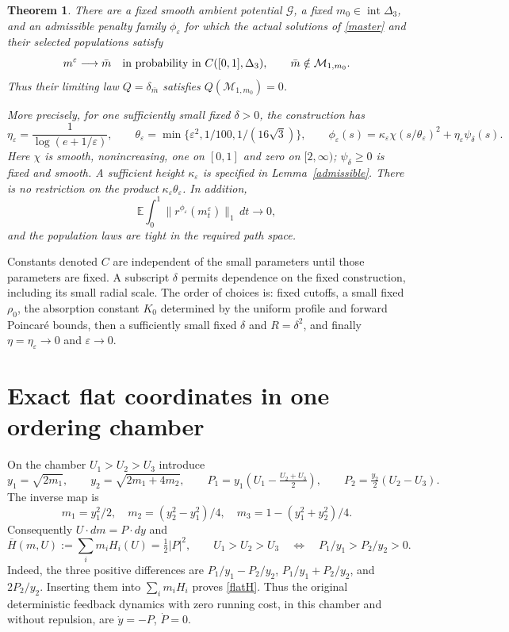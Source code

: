 \documentclass[11pt,a4paper]{article}
\newtheorem{theorem}{Theorem}
\newcommand{\E}{\mathbb E}
\newcommand{\G}{\mathcal G}
\newcommand{\Hb}{\overline H}
\newcommand{\dt}{\,dt}
\begin{document}
\begin{theorem}\label{main}
There are a fixed smooth ambient potential $\G$, a fixed
$m_0\in\operatorname{int}\Delta_3$, and an admissible penalty family
$\phi_\varepsilon$ for which the actual solutions of \eqref{master}
and their selected populations satisfy
\[
 m^\varepsilon\longrightarrow \bar m
 \quad\hbox{in probability in }C([0,1],\Delta_3),
 \qquad \bar m\notin\mathcal M_{1,m_0}.
\]
Thus their limiting law $Q=\delta_{\bar m}$ satisfies
$Q(\mathcal M_{1,m_0})=0$.

More precisely, for one sufficiently small fixed $\delta>0$, the
construction has
\begin{equation}\label{scales}
 \eta_\varepsilon=\frac1{\log(e+1/\varepsilon)},\qquad
 \theta_\varepsilon=\min\{\varepsilon^2,1/100,1/(16\sqrt3)\},
 \qquad
 \phi_\varepsilon(s)=\kappa_\varepsilon
       \chi(s/\theta_\varepsilon)^2+\eta_\varepsilon\psi_\delta(s).
\end{equation}
Here $\chi$ is smooth, nonincreasing, one on $[0,1]$ and zero on
$[2,\infty)$; $\psi_\delta\geq0$ is fixed and smooth. A sufficient
height $\kappa_\varepsilon$ is specified in Lemma~\ref{admissible}.
There is no restriction on the product
$\kappa_\varepsilon\theta_\varepsilon$. In addition,
\[
 \E\int_0^1\|r^{\phi_\varepsilon}(m_t^\varepsilon)\|_1\dt
       \longrightarrow0,
\]
and the population laws are tight in the required path space.
\end{theorem}

Constants denoted $C$ are independent of the small parameters until
those parameters are fixed. A subscript $\delta$ permits dependence
on the fixed construction, including its small radial scale.
The order of choices is: fixed cutoffs, a small fixed $\rho_0$, the
absorption constant $K_0$ determined by the uniform profile and forward
Poincar\'e bounds, then a sufficiently small fixed $\delta$ and
$R=\delta^2$, and finally
$\eta=\eta_\varepsilon\to0$ and $\varepsilon\to0$.

\section{Exact flat coordinates in one ordering chamber}
On the chamber $U_1>U_2>U_3$ introduce
\begin{equation}\label{flat}
 y_1=\sqrt{2m_1},\qquad y_2=\sqrt{2m_1+4m_2},\qquad
 P_1=y_1\left(U_1-\tfrac{U_2+U_3}{2}\right),\qquad
 P_2=\tfrac{y_2}{2}(U_2-U_3).
\end{equation}
The inverse map is
\[
 m_1=y_1^2/2,\quad m_2=(y_2^2-y_1^2)/4,\quad
 m_3=1-(y_1^2+y_2^2)/4.
\]
Consequently $U\cdot dm=P\cdot dy$ and
\begin{equation}\label{flatH}
 \Hb(m,U):=\sum_i m_iH_i(U)=\tfrac12|P|^2,
 \qquad U_1>U_2>U_3\quad\Longleftrightarrow\quad P_1/y_1>P_2/y_2>0.
\end{equation}
Indeed, the three positive differences are
$P_1/y_1-P_2/y_2$, $P_1/y_1+P_2/y_2$, and $2P_2/y_2$.
Inserting them into $\sum_i m_iH_i$ proves \eqref{flatH}.
Thus the original deterministic feedback dynamics with zero running
cost, in this chamber and without repulsion, are
$\dot y=-P$, $\dot P=0$.
\end{document}

